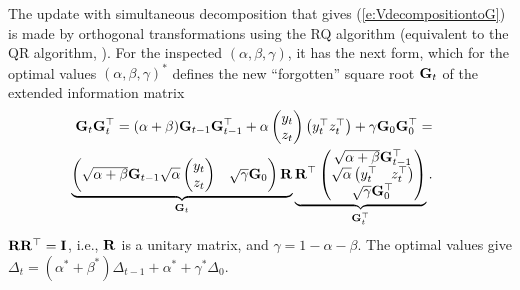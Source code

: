 The update with simultaneous decomposition that gives (\ref{e:VdecompositiontoG}) is made by orthogonal transformations using the RQ algorithm (equivalent to the QR algorithm, \cite{GolLoa:12}). For the inspected $(\alpha,\beta,\gamma)$, it has the next form, which for the optimal values
$(\alpha,\beta,\gamma)^{\ast}$
 defines the new ``forgotten'' square root $\mathbf{G}_{t}$ of the extended information matrix
\begin{eqnarray*}
&&\hspace*{-5ex}\mat{G}_{t}\mat{G}_{t}^{\top}=(\alpha + \beta)\mat{G}_{t-1}\mat{G}_{t-1}^{\top} +
\alpha\begin{pmatrix}y_{t}\\
z_{t}\end{pmatrix}
\begin{pmatrix}
    y_{t}^{\top} z_{t}^{\top}
\end{pmatrix} +\gamma\mat{G}_{0}\mat{G}_{0}^{\top}=\\
\nonumber
&&\hspace*{-5ex}
\underbrace{
\begin{pmatrix}
    \sqrt{\alpha+\beta}\mat{G}_{t-1} \sqrt{\alpha}
    \begin{pmatrix}y_{t}\\ z_{t}
    \end{pmatrix}&
     \sqrt{\gamma}\mat{G}_{0}
\end{pmatrix}
\mat{R}}_{\mat{G}_{t}}
\underbrace{\mat{R}^{\top}
\begin{pmatrix}
    \sqrt{\alpha+\beta}\mat{G}_{t-1}^{\top}  \\
    \sqrt{\alpha}
    \begin{pmatrix}y_{t}^{\top}& z_{t}^{\top}
    \end{pmatrix}
    \\ \sqrt{\gamma}\mat{G}_{0}^{\top}
 \end{pmatrix}}_{\mat{G}_{t}^{\top} }.
 \end{eqnarray*}
 $\mathbf{R}\mathbf{R}^{\top}  = \mathbf{I}$, i.e., $\mathbf{R}$ is a unitary matrix, and $\gamma = 1-\alpha-\beta$. The optimal values give $\Delta_{t}=(\alpha^{\ast}+\beta^{\ast})\Delta_{t-1}+\alpha^{\ast}+\gamma^{\ast}\Delta_{0}$. 